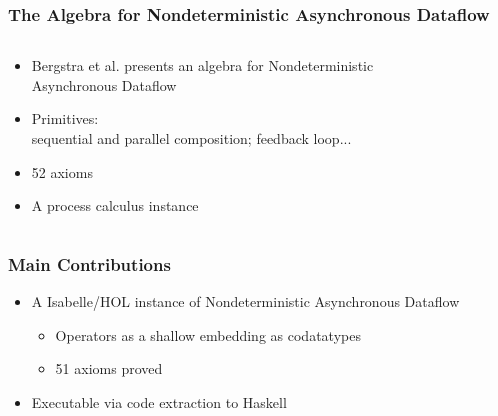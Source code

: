 \documentclass[fleqn,aspectratio=169,10pt]{beamer}
\begin{document}
\begin{frame}[fragile]
  \frametitle{The Algebra for Nondeterministic Asynchronous Dataflow}
  \begin{columns}
    \begin{column}{.6\textwidth}
      \begin{itemize}
        \item Bergstra et al. presents an algebra for Nondeterministic Asynchronous Dataflow
        \item Primitives:\\
              sequential and parallel composition; feedback loop...
        \item 52 axioms
        \item A process calculus instance
      \end{itemize}
    \end{column}
    \begin{column}{.4\textwidth}
      \begin{figure}
        \centering
      \end{figure}
    \end{column}
  \end{columns}
\end{frame}

\begin{frame}[fragile]
  \frametitle{Main Contributions}
  \begin{itemize}
    \item A Isabelle/HOL instance of Nondeterministic Asynchronous Dataflow
          \begin{itemize}
            \item Operators as a shallow embedding as codatatypes
            \item 51 axioms proved
          \end{itemize}
    \item Executable via code extraction to Haskell
  \end{itemize}
\end{frame}
\end{document}
